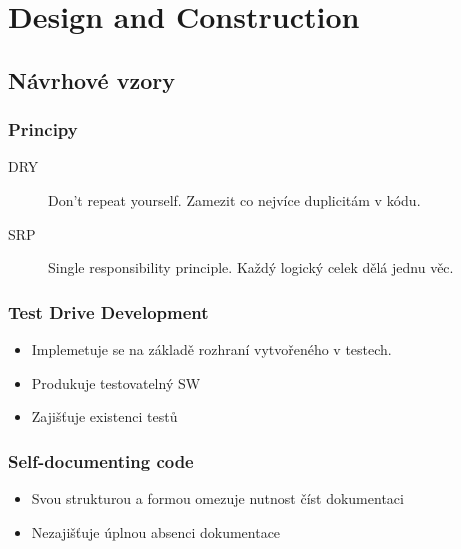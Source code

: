 \section{Design and Construction}

  \subsection{Návrhové vzory}
    \subsubsection{Principy}
      \begin{description}
        \item[DRY] Don't repeat yourself. Zamezit co nejvíce duplicitám v kódu.
        \item[SRP] Single responsibility principle. Každý logický celek dělá jednu věc.
      \end{description}

    \subsubsection{Test Drive Development}
      \begin{itemize}
        \item Implemetuje se na základě rozhraní vytvořeného v testech.
        \item Produkuje testovatelný SW
        \item Zajišťuje existenci testů
      \end{itemize}

    \subsubsection{Self-documenting code}
      \begin{itemize}
        \item Svou strukturou a formou omezuje nutnost číst dokumentaci
        \item Nezajišťuje úplnou absenci dokumentace
      \end{itemize}
